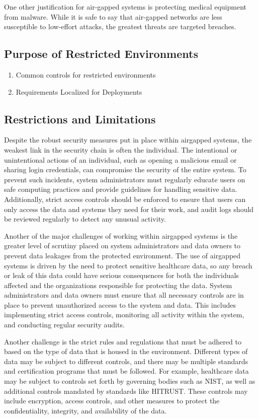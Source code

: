 \documentclass{amia}
\begin{document}
One other justification for air-gapped systems is protecting medical equipment from malware. While it is safe to say that air-gapped networks are less susceptible to low-effort attacks, the greatest threats are targeted breaches.

\subsection{Purpose of Restricted Environments}

\begin{enumerate}
	\item Common controls for restricted environments
	\item Requirements Localized for Deployments
\end{enumerate}

\subsection{Restrictions and Limitations}

Despite the robust security measures put in place within airgapped systems, the weakest link in the security chain is often the individual. The intentional or unintentional actions of an individual, such as opening a malicious email or sharing login credentials, can compromise the security of the entire system. To prevent such incidents, system administrators must regularly educate users on safe computing practices and provide guidelines for handling sensitive data. Additionally, strict access controls should be enforced to ensure that users can only access the data and systems they need for their work, and audit logs should be reviewed regularly to detect any unusual activity.

Another of the major challenges of working within airgapped systems is the greater level of scrutiny placed on system administrators and data owners to prevent data leakages from the protected environment. The use of airgapped systems is driven by the need to protect sensitive healthcare data, so any breach or leak of this data could have serious consequences for both the individuals affected and the organizations responsible for protecting the data. System administrators and data owners must ensure that all necessary controls are in place to prevent unauthorized access to the system and data. This includes implementing strict access controls, monitoring all activity within the system, and conducting regular security audits.

Another challenge is the strict rules and regulations that must be adhered to based on the type of data that is housed in the environment. Different types of data may be subject to different controls, and there may be multiple standards and certification programs that must be followed. For example, healthcare data may be subject to controls set forth by governing bodies such as NIST, as well as additional controls mandated by standards like HITRUST. These controls may include encryption, access controls, and other measures to protect the confidentiality, integrity, and availability of the data.
\end{document}
